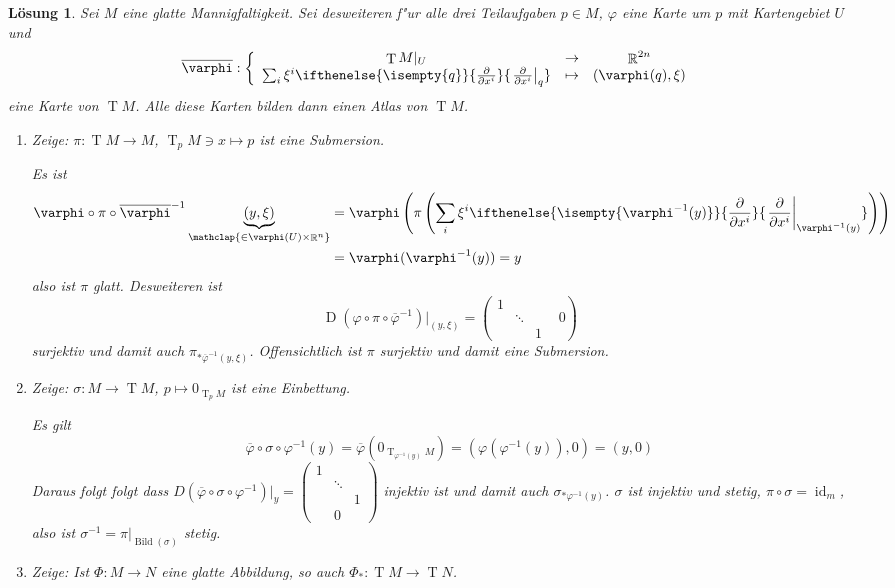 \documentclass[paper=A4, twoside, chapterprefix=true, bibliography=totoc, headsepline]{scrbook}
\let\temp\phi{}
\let\phi\varphi{}
\let\varphi\temp{}
\let\temp\theta{}
\let\theta\vartheta{}
\let\vartheta\temp{}
\let\temp\epsilon{}
\let\epsilon\varepsilon{}
\let\varepsilon\temp{}
\let\temp\rho{}
\let\rho\varrho{}
\let\varrho\temp{}
\DeclareMathOperator{\R}{\mathbb{R}}
\DeclareMathOperator{\Bild}{Bild}
\DeclareMathOperator{\D}{D}         %
\DeclareMathOperator{\Id}{id}       %
\DeclareMathOperator{\T}{T}         %
\newcommand{\X}{\times}
\newcommand{\pdifffrac}[3][]{\ifthenelse{\isempty{#1}}{\frac{\partial #2}{\partial #3}}{\left. \frac{\partial #2}{\partial #3} \right|_{#1}}}
\theoremstyle{plain}
\theoremstyle{nonumberplain}
\theoremstyle{empty}
\theoremstyle{break}
\newtheorem{Loes}{L\"osung}
\begin{document}
\begin{Loes}
Sei $M$ eine glatte Mannigfaltigkeit. Sei desweiteren f"ur alle drei Teilaufgaben $p \in M$, $\phi$ eine Karte um $p$ mit Kartengebiet $U$ und
	\[ \overline \phi: \left\{ \begin{array}{ccc}  \T M|_U &\to& \R^{2n} \\
		\sum_i \xi^i\pdifffrac[q]{}{x^i} &\mapsto& (\phi(q), \xi) \end{array} \right.\]
eine Karte von $\T M$. Alle diese Karten bilden dann einen Atlas von $\T M$.
\begin{enumerate}[label=\alph*),widest=a,leftmargin=*]
\item
	\emph{Zeige:} $\pi: \T M \to M$, $\T_p M \ni x \mapsto p$ ist eine Submersion.
	
	Es ist
	\begin{align*} \phi \circ \pi \circ \overline \phi^{-1} \underbrace{(y, \xi)}_{\mathclap{\in \phi(U) \X \R^n}} &= \phi\left(\pi\left(\sum_i \xi^i \pdifffrac[\phi^{-1}(y)]{}{x^i}\right)\right)\\
		&= \phi(\phi^{-1}(y)) = y
	\end{align*}
	also ist $\pi$ glatt. Desweiteren ist
		\[ \D(\phi \circ \pi \circ \overline \phi^{-1})|_{(y, \xi)} = \left(\begin{smallmatrix}
        1 &  & \\
        & \ddots & & \\
         & & 1
      \end{smallmatrix} 0\right) \]
     surjektiv und damit auch $\pi_{*\overline\phi^{-1}(y, \xi)}$. Offensichtlich ist $\pi$ surjektiv und damit eine Submersion.
\item
	\emph{Zeige:} $\sigma: M \to \T M$, $p \mapsto 0_{\T_pM}$ ist eine Einbettung.
	
	Es gilt
		\[\overline \phi \circ \sigma \circ \phi^{-1} (y) = \overline \phi(0_{\T_{\phi^{-1}(y)}M}) = (\phi(\phi^{-1}(y)),0) = (y,0) \]
	Daraus folgt folgt dass $D(\overline \phi \circ \sigma \circ \phi^{-1})|_y = \left( \begin{smallmatrix} 1 & &  \\ & \ddots & \\ & & 1 \\ & 0 & \end{smallmatrix} \right)$ injektiv ist und damit auch $\sigma_{* \phi^{-1}(y)}$. $\sigma$ ist injektiv und stetig, $\pi \circ \sigma = \Id_m$, also ist $\sigma^{-1} = \pi|_{\Bild(\sigma)}$ stetig.
\item
	\emph{Zeige:} Ist $\Phi: M \to N$ eine glatte Abbildung, so auch $\Phi_*: \T M \to \T N$.
	

\end{enumerate}
\end{Loes}
\end{document}
